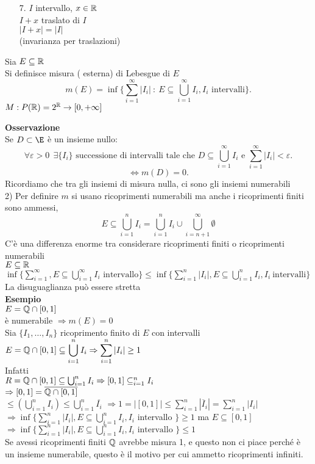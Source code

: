\documentclass[12px]{article}
\begin{document}
	   \begin{itemize}
	   \item[7.]	$I$ intervallo, $x\in\mathbb{R}$\\
		    $I + x$ traslato di $I$ \\
		    $|I+x| = |I|$\\
		    (invarianza per traslazioni)
	   \end{itemize}
	   \begin{defi}
	Sia $E\subseteq \mathbb{R}$\\
	Si definisce misura ( esterna) di Lebesgue di $E$ 
	\[
		m(E) = \inf\lbrace\sum ^\infty_{i=1} |I_i|\  :\ E\subseteq \bigcup^\infty_{i=1} I_i, I_i \text { intervalli}\rbrace
	.\] 
	$M:P(\mathbb{R}) = 2^{\mathbb{R}} \rightarrow [0,+\infty]$
\end{defi}
\textbf{Osservazione}\\
Se $D\subset \E$ è un insieme nullo:
\[
	\forall \varepsilon >0\ \ \exists \{I_i\} \text{ successione di intervalli tale che }  D\subseteq\bigcup^\infty_{i=1}I_i \text { e } \sum^\infty_{i=1}|I_i| < \varepsilon
.\]
\[
	\Leftrightarrow m(D) = 0
.\] 
Ricordiamo che tra gli insiemi di misura nulla, ci sono gli insiemi numerabili\\
2) Per definire $m$ si usano ricoprimenti numerabili ma anche i ricoprimenti finiti sono ammessi,
\[ E\subseteq \bigcup^n_{i=1}I_i = \bigcup^n_{i=1}I_i\cup\bigcup^\infty_{i = n+1}\emptyset\]
C'è una differenza enorme tra considerare ricoprimenti finiti o ricoprimenti numerabili\\
$E\subseteq \mathbb{R}$\\
$\inf\{ \sum^\infty_{i=1}, E\subseteq\bigcup^\infty_{i=1}I_i \text { intervallo}\}\leq \inf\{ \sum^n_{i=1}|I_i|, E\subseteq\bigcup^n_{i=1}I_i, I_i\ \text{intervalli}\}$\\
La disuguaglianza può essere stretta\\
\textbf{Esempio}\\
$E = \mathbb{Q}\cap[0,1]$\\
è numerabile  $ \Rightarrow m(E) = 0$ \\
Sia $\{I_1,\ldots,I_n\}$ ricoprimento finito di $E$ con intervalli\\
$\displaystyle E  = \mathbb{Q}\cap[0,1]\subseteq \bigcup^n_{i=1}I_i \Rightarrow \sum^n_{i=1}|I_i|\geq 1$ \\
Infatti\\
$R = \mathbb{Q}\cap[0,1]\subseteq\bigcup^n_{i=1}I_i \Rightarrow [0,1]\subseteq^n_{i=1}I_i$ \\
$ \Rightarrow [0,1]=\overline{\mathbb{Q}\cap[0,1]}$ \\
$\displaystyle\leq (\bigcup^n_{i=1}I_i)\leq \bigcup^n_{i=1}\overline{I_i}$
$ \Rightarrow 1 = |[0,1]| \leq \sum^n_{i=1} |\overline I_i| = \sum^n_{i=1}|I_i|$ \\
$ \displaystyle\Rightarrow \inf\{ \sum^n_{i=1}|I_i|, E\subseteq \bigcup_{i=1}^n I_i, I_i $ intervallo $\} \geq 1$ ma  $E\subseteq [0,1]$\\
$ \displaystyle\Rightarrow \inf\{\sum^n_{i=1}|I_i|, E\subseteq \bigcup_{i=1}^n I_i, I_i\text{ intervallo }\}\leq 1$ \\
Se avessi ricoprimenti finiti $\mathbb{Q}$ avrebbe misura 1, e questo non ci piace perché è un insieme numerabile, questo è il motivo per cui ammetto ricoprimenti infiniti.
\end{document}
